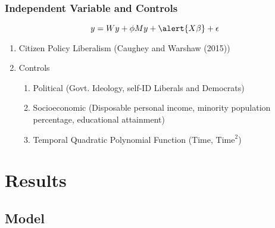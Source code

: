 \documentclass{beamer}
\begin{document}
\begin{frame}
	\frametitle{Independent Variable and Controls}
		\[y=Wy+\phi My+\alert{X\beta}+\epsilon\]
		\begin{enumerate}
			\item Citizen Policy Liberalism (Caughey and Warshaw (2015))
			\item Controls
			\begin{enumerate}
				\item Political (Govt. Ideology, self-ID Liberals and Democrats)
				\item Socioeconomic (Disposable personal income, minority population percentage, educational attainment)
				\item Temporal Quadratic Polynomial Function (Time, $\mbox{Time}^2$)
			\end{enumerate}
		\end{enumerate}
\end{frame}

\section{Results}
\subsection{Model}
\end{document}
